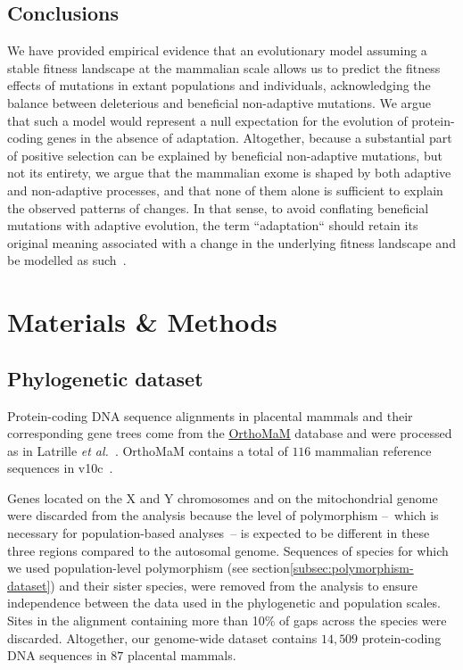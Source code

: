\documentclass[10pt,letterpaper]{article}
\providecommand{\DIFaddtex}[1]{{\protect\color{blue}\uwave{#1}}} %
\providecommand{\DIFaddbegin}{} %
\providecommand{\DIFaddend}{} %
\providecommand{\DIFadd}[1]{\texorpdfstring{\DIFaddtex{#1}}{#1}} %
\newcommand{\DIFaddincludegraphics}[2][]{{\color{blue}\fbox{\DIFOincludegraphics[#1]{#2}}}} %
\DeclareRobustCommand{\DIFaddbegin}{\DIFOaddbegin \let\includegraphics\DIFaddincludegraphics} %
\DeclareRobustCommand{\DIFaddend}{\DIFOaddend \let\includegraphics\DIFOincludegraphics} %
\begin{document}
\subsection*{Conclusions}

We have provided empirical evidence that an evolutionary model assuming a stable fitness landscape at the mammalian scale allows us to predict the fitness effects of mutations in extant populations and individuals, acknowledging the balance between deleterious and beneficial non-adaptive mutations.
We argue that such a model would represent a null expectation for the evolution of protein-coding genes in the absence of adaptation.
Altogether, because a substantial part of positive selection can be explained by beneficial non-adaptive mutations, but not its entirety, we argue that the mammalian exome is shaped by both adaptive and non-adaptive processes, and that none of them alone is sufficient to explain the observed patterns of changes.
In that sense, to avoid conflating beneficial mutations with adaptive evolution, the term ``adaptation`` should retain its original meaning associated with a change in the underlying fitness landscape and be modelled as such~\cite{mustonen_fitness_2009, mustonen_fitness_2010}.

\newpage
\section{Materials \& Methods}
\label{sec:methods}

\subsection{Phylogenetic dataset}\label{subsec:phylo-dataset}

Protein-coding DNA sequence alignments in placental mammals and their corresponding gene trees come from the \href{https://www.orthomam.univ-montp2.fr}{OrthoMaM} database and were processed as in Latrille \textit{et al.}~\cite{latrille_genes_2023}.
OrthoMaM contains a total of $116$ mammalian reference sequences in v10c~\cite{ranwez_orthomam_2007, douzery_orthomam_2014, scornavacca_orthomam_2019}.

Genes located on the X and Y chromosomes and on the mitochondrial genome were discarded from the analysis because the level of polymorphism –~which is necessary for population-based analyses~– is expected to be different in these three regions compared to the autosomal genome.
Sequences of species for which we used population-level polymorphism (see section\DIFaddbegin \DIFadd{~}\DIFaddend \ref{subsec:polymorphism-dataset}) and their sister species, were removed from the analysis to ensure independence between the data used in the phylogenetic and population scales.
Sites in the alignment containing more than 10\% of gaps across the species were discarded.
Altogether, our genome-wide dataset contains $14,509$ protein-coding DNA sequences in $87$ placental mammals.
\end{document}
